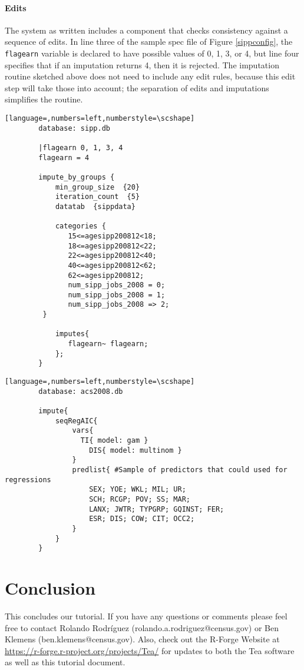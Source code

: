 \documentclass{article}
\begin{document}
{     \paragraph{Edits} The system as written includes a component that checks consistency
        against a sequence of edits. In line three of the sample spec file of Figure
        \ref{sippconfig}, the {\tt flagearn} variable is declared to have possible values of 0,
        1, 3, or 4, but line four specifies that if an imputation returns 4, then it is rejected.
        The imputation routine sketched above does not need to include any edit rules, because
        this edit step will take those into account; the separation of edits and imputations
        simplifies the routine.
        \begin{lstlisting}[language=,numbers=left,numberstyle=\scshape]
        database: sipp.db

        |flagearn 0, 1, 3, 4
        flagearn = 4

        impute_by_groups {
            min_group_size  {20}
            iteration_count  {5}
            datatab  {sippdata}

            categories {
               15<=agesipp200812<18;
               18<=agesipp200812<22;
               22<=agesipp200812<40;
               40<=agesipp200812<62;
               62<=agesipp200812;
               num_sipp_jobs_2008 = 0;
               num_sipp_jobs_2008 = 1;
               num_sipp_jobs_2008 => 2;
         }

            imputes{
               flagearn~ flagearn;
            };
        }
        \end{lstlisting}

        \begin{lstlisting}[language=,numbers=left,numberstyle=\scshape]
        database: acs2008.db

        impute{
            seqRegAIC{
                vars{
                  TI{ model: gam }
                    DIS{ model: multinom }
                }
                predlist{ #Sample of predictors that could used for regressions
                    SEX; YOE; WKL; MIL; UR;
                    SCH; RCGP; POV; SS; MAR;
                    LANX; JWTR; TYPGRP; GQINST; FER;
                    ESR; DIS; COW; CIT; OCC2;
                }
            }
        }

        \end{lstlisting}
}

\section{Conclusion}
This concludes our tutorial. If you have any questions or comments please feel
free to contact Rolando Rodr\'iguez (rolando.a.rodriguez@census.gov) or
Ben Klemens (ben.kle\-mens@census.gov). Also, check out the R-Forge Website at
\url{https://r-forge.r-project.org/projects/Tea/} for updates to both the Tea software
as well as this tutorial document.
\end{document}
